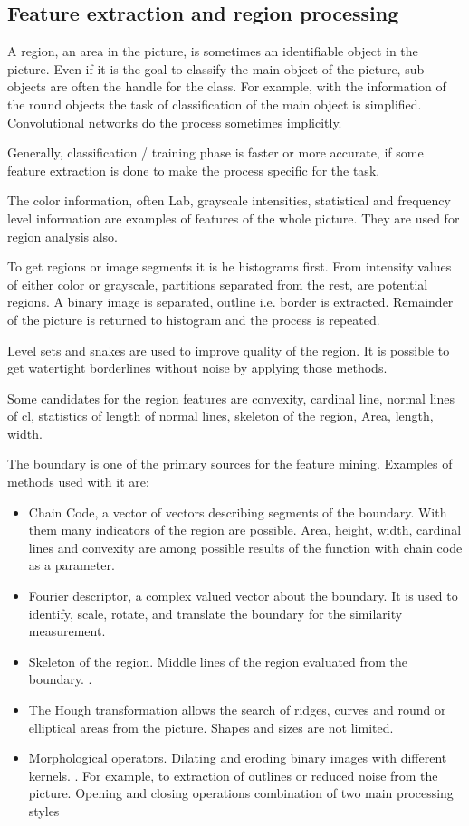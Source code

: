 \documentclass[doc/report.tex]{subfiles}
\begin{document}
\subsection{Feature extraction and region processing}
A region, an area in the picture, is sometimes an identifiable object in the
picture. Even if it is the goal to classify the main object of the picture,
sub-objects are often the handle for the class. For example, with the
information of the round objects the task of classification of the main object
is simplified. Convolutional networks do the process sometimes implicitly.

Generally, classification / training phase is faster or more accurate, if some
feature extraction is done to make the process specific for the task.

The color information, often Lab, grayscale intensities, statistical and
frequency level information are examples of features of the whole picture. They
are used for region analysis also.

To get regions or image segments it is he histograms first. From intensity
values of either color or grayscale, partitions separated from the rest, are
potential regions. A binary image is separated, outline i.e. border is
extracted. Remainder of the picture is returned to histogram and the process is
repeated.

Level sets and snakes are used to improve quality of the region. It is possible
to get watertight borderlines without noise by applying those methods.

Some candidates for the region features are convexity, cardinal line, normal
lines of cl, statistics of length of normal lines, skeleton of the region,
Area, length, width.

The boundary is one of the primary sources for the feature mining. Examples of
methods used with it are:

\begin{itemize}
    \item Chain Code, a vector of vectors describing segments of the boundary.
        With them many indicators of the region are possible. Area, height,
        width, cardinal lines and convexity are among possible results of the
        function with chain code as a parameter.
    \item Fourier descriptor, a complex valued vector about the boundary. It is
        used to identify, scale, rotate, and translate the boundary for the
        similarity measurement.
    \item Skeleton of the region. Middle lines of the region evaluated from the
        boundary. .
    \item The Hough transformation allows the search of ridges, curves and
        round or elliptical areas from the picture. Shapes and sizes are not
        limited.
    \item Morphological operators. Dilating and eroding binary images with
        different kernels. . For example, to extraction of outlines or reduced
        noise from the picture. Opening and closing operations combination of
        two main processing styles
\end{itemize}
\end{document}
